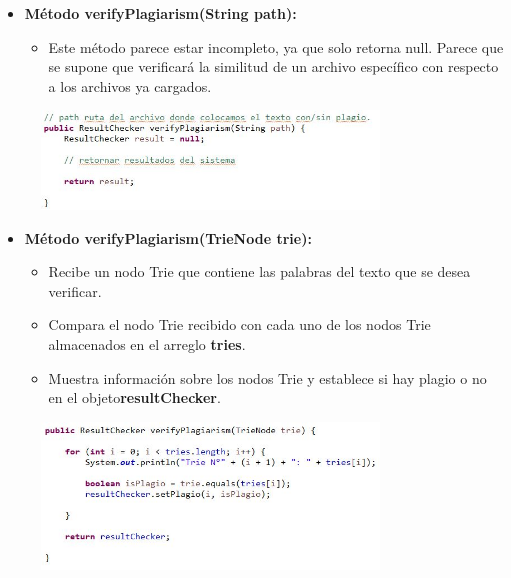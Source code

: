 \documentclass{article}
\begin{document}
	\begin{itemize}
	\item \textbf{Método verifyPlagiarism(String path):}
	 \begin{itemize}
	 \item Este método parece estar incompleto, ya que solo retorna null. Parece que se supone que verificará la similitud de un archivo específico con respecto a los archivos ya cargados.
	 \end{itemize}
	\end{itemize}
	 \begin{figure}[H]
		\centering
		\includegraphics[width=0.8\textwidth,keepaspectratio]{img/PC5.jpg}
	\end{figure}
	
	\begin{itemize}
	\item \textbf{Método verifyPlagiarism(TrieNode trie):}
	 \begin{itemize}
	 \item Recibe un nodo Trie que contiene las palabras del texto que se desea verificar.
	 \item Compara el nodo Trie recibido con cada uno de los nodos Trie almacenados en el arreglo \textbf{tries}.
	 \item Muestra información sobre los nodos Trie y establece si hay plagio o no en el objeto\textbf{resultChecker}.
	 \end{itemize}
	\end{itemize}
	 \begin{figure}[H]
		\centering
		\includegraphics[width=0.8\textwidth,keepaspectratio]{img/PC6.jpg}
	\end{figure}
	
\end{document}

